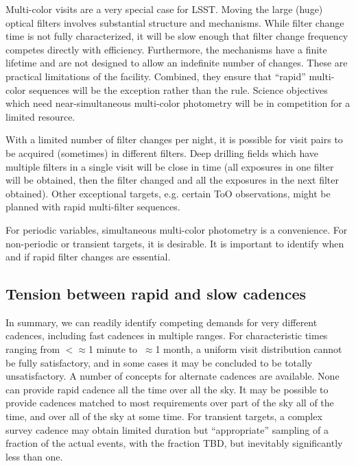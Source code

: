 Multi-color visits are a very special case for LSST.  Moving the large
(huge) optical filters involves substantial structure and mechanisms.
While filter change time is not fully characterized, it will be slow
enough that filter change frequency competes directly with efficiency.
Furthermore, the mechanisms have a finite lifetime and are not designed
to allow an indefinite number of changes.  These are practical
limitations of the facility. Combined, they ensure that ``rapid''
multi-color sequences will be the exception rather than the rule.
Science objectives which need near-simultaneous multi-color photometry
will be in competition for a limited resource.

With a limited number of filter changes per night, it is possible for
visit pairs to be acquired (sometimes) in different filters.  Deep
drilling fields which have multiple filters in a single visit will be
close in time (all exposures in one filter will be obtained, then the
filter changed and all the exposures in the next filter obtained).
Other exceptional targets, e.g. certain ToO observations, might be
planned with rapid multi-filter sequences.

For periodic variables, simultaneous multi-color photometry is a
convenience.  For non-periodic or transient targets, it is desirable. It
is important to identify when and if rapid filter changes are essential.

\subsection{Tension between rapid and slow cadences}

In summary, we can readily identify competing demands for very different
cadences, including fast cadences in multiple ranges. For characteristic
times ranging from  $<\approx$1 minute to $~\approx$1 month, a uniform
visit distribution cannot be fully satisfactory, and in some cases it
may be concluded to be totally unsatisfactory.  A number of concepts for
alternate cadences are available.  None can provide rapid cadence all
the time over all the sky. It may be possible to provide cadences
matched to most requirements over part of the sky all of the time, and
over all of the sky at some time. For transient targets, a complex
survey cadence may obtain limited duration but ``appropriate'' sampling
of a fraction of the actual events, with the fraction TBD, but
inevitably significantly less than one.

